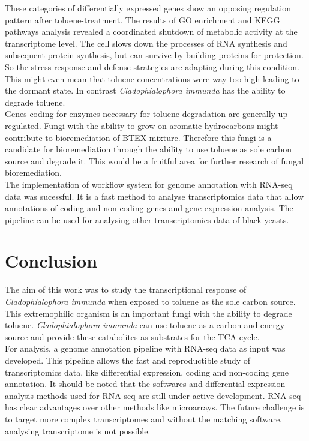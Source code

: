\documentclass[12pt, a4paper]{report}
\begin{document}
These categories of differentially expressed genes show an opposing regulation pattern after toluene-treatment. The results of GO enrichment and KEGG pathways analysis revealed a coordinated shutdown of metabolic activity at the transcriptome level. The cell slows down the processes of RNA synthesis and subsequent protein synthesis, but can survive by building proteins for protection. 
So the stress response and defense strategies are adapting during this condition. This might even mean that toluene concentrations were way too high leading to the dormant state. In contrast \textit{Cladophialophora immunda} has the ability to degrade toluene. \\
Genes coding for enzymes necessary for toluene degradation are generally up-regulated. Fungi with the ability to grow on aromatic hydrocarbons might contribute to bioremediation of BTEX mixture. Therefore this fungi is a candidate for bioremediation through the ability to use toluene as sole carbon source and degrade it. This would be a fruitful area for further research of fungal bioremediation. \\

The implementation of workflow system for genome annotation with RNA-seq data was sucessful. It is a fast method to analyse transcriptomics data that allow annotations of coding and non-coding genes and gene expression analysis. The pipeline can be used for analysing other transcriptomics data of black yeasts.\\

\newpage
\chapter*{Conclusion}
The aim of this work was to study the transcriptional response of \textit{Cladophialophora immunda} when exposed to toluene as the sole carbon source. This extremophilic organism is an important fungi with the ability to degrade toluene. \textit{Cladophialophora immunda} can use toluene as a carbon and energy source  and provide these catabolites as substrates for the TCA cycle. \\

For analysis, a genome annotation pipeline with RNA-seq data as input was developed. This pipeline allows the fast and reproductible study of transcriptomics data, like differential expression, coding and non-coding gene annotation. It should be noted that the softwares and differential expression analysis methods used for RNA-seq are still under active development. RNA-seq has clear advantages over other methods like microarrays. The future challenge is to target more complex transcriptomes and without the matching software, analysing transcriptome is not possible. \\
 
\end{document}
